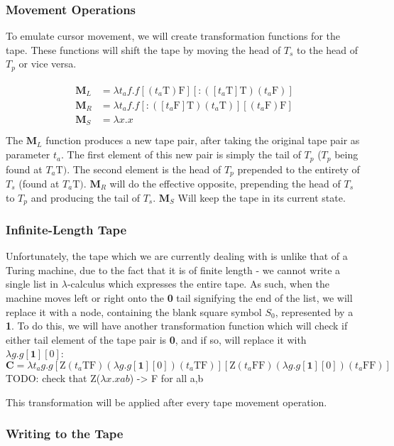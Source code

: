 \documentclass[Master.tex]{subfiles}
\begin{document}
\subsubsection{Movement Operations}
To emulate cursor movement, we will create transformation functions for the tape. These functions will shift the tape by moving the head of $T_s$ to the head of $T_p$ or vice versa.

\begin{gather*}
\begin{aligned}
\bm{M}_L &= \lambda t_a f.f [(t_a\bm{\mathrm{T}})\bm{\mathrm{F}}] [\bm{\mathrm{:}}([t_a\bm{\mathrm{T}}]\bm{\mathrm{T}})(t_a\bm{\mathrm{F}})]\\
\bm{M}_R &= \lambda t_a f.f [\bm{\mathrm{:}}([t_a\bm{\mathrm{F}}]\bm{\mathrm{T}})(t_a\bm{\mathrm{T}})] [(t_a\bm{\mathrm{F}})\bm{\mathrm{F}}]\\
\bm{M}_S &= \lambda x.x\\
\end{aligned}
\end{gather*}
The $\bm{M}_L$ function produces a new tape pair, after taking the original tape pair as parameter $t_a$. The first element of this new pair is simply the tail of $T_p$ ($T_p$ being found at $T_a\bm{\mathrm{T}})$. The second element is the head of $T_p$ prepended to the entirety of $T_s$ (found at $T_a\bm{\mathrm{T}})$. $\bm{M}_R$ will do the effective opposite, prepending the head of $T_s$ to $T_p$ and producing the tail of $T_s$. $\bm{M}_S$ Will keep the tape in its current state.

\subsubsection{Infinite-Length Tape}

Unfortunately, the tape which we are currently dealing with is unlike that of a Turing machine, due to the fact that it is of finite length - we cannot write a single list in $\lambda$-calculus which expresses the entire tape. As such, when the machine moves left or right onto the \textbf{0} tail signifying the end of the list, we will replace it with a node, containing the blank square symbol $S_0$, represented by a \textbf{1}. To do this, we will have another transformation function which will check if either tail element of the tape pair is \textbf{0}, and if so, will replace it with $\lambda g.g[\bm{\textbf{1}}][\bm{\mathrm{0}}]$:
\begin{equation*}
\bm{C} = \lambda t_ag.g[\bm{\mathrm{Z}}(t_a\bm{\mathrm{T}}\bm{\mathrm{F}})(\lambda g.g[\bm{\textbf{1}}][\bm{\mathrm{0}}])(t_a\bm{\mathrm{T}}\bm{\mathrm{F}})][\bm{\mathrm{Z}}(t_a\bm{\mathrm{F}}\bm{\mathrm{F}})(\lambda g.g[\bm{\textbf{1}}][\bm{\mathrm{0}}])(t_a\bm{\mathrm{F}}\bm{\mathrm{F}})]
\end{equation*}
TODO: check that Z($\lambda x.xab$) -> F for all a,b

This transformation will be applied after every tape movement operation.

\subsubsection{Writing to the Tape}
\end{document}
